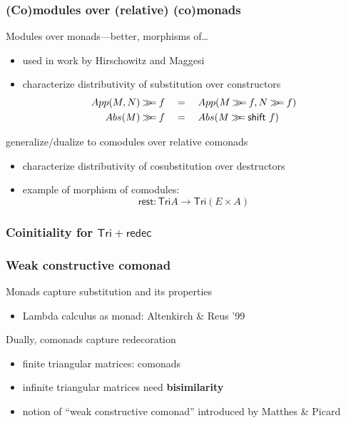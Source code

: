\documentclass[
serif,
mathsans,
]
{beamer}
\newcommand{\constfont}[1]{\ensuremath{\mathsf{#1}}}
\newcommand{\bind}[2]{{#1}\mathbin{\gg\hspace{-.8ex}=}{#2}}
\newcommand{\Tri}{\constfont{Tri}}
\newcommand{\tail}{\constfont{rest}}
\newcommand{\redec}{\constfont{redec}}
\newcommand{\shift}{\constfont{shift}}
\newcommand{\fat}[1]{\textbf{#1}}
\begin{document}
\begin{frame}
 \frametitle{(Co)modules over (relative) (co)monads}
 \begin{block}{Modules over monads---better, morphisms of\ldots}
  \begin{itemize}
   \item used in work by Hirschowitz and Maggesi
   \item characterize distributivity of substitution over constructors
      \begin{align*} \bind{App(M,N)}{f} \quad &= \quad App(\bind{M}{f},\bind{N}{f}) \\
                     \bind{Abs(M)}{f}       \quad &= \quad Abs(\bind{M}{\shift~f})
      \end{align*}
  \end{itemize}
 \end{block}

 \begin{block}{generalize/dualize to comodules over relative comonads}
  \begin{itemize}
   \item characterize distributivity of cosubstitution over destructors
   \item example of morphism of comodules:  \[\tail : \Tri A \to \Tri(E\times A)\]
  \end{itemize}
 \end{block}
 
\end{frame}


\begin{frame}
 \frametitle{Coinitiality for $\Tri + \redec$}
\end{frame}



\begin{frame}
 \frametitle{Weak constructive comonad}
 \begin{block}{Monads capture substitution and its properties}
   \begin{itemize}
    \item Lambda calculus as monad: Altenkirch \& Reus '99
   \end{itemize}
 \end{block}

\begin{block}{Dually, comonads capture redecoration}
   \begin{itemize}
    \item finite triangular matrices: comonads
    \item infinite triangular matrices need \fat{bisimilarity}
    \item notion of \enquote{weak constructive comonad} introduced by Matthes \& Picard
   \end{itemize}
\end{block} 
\end{frame}
\end{document}

